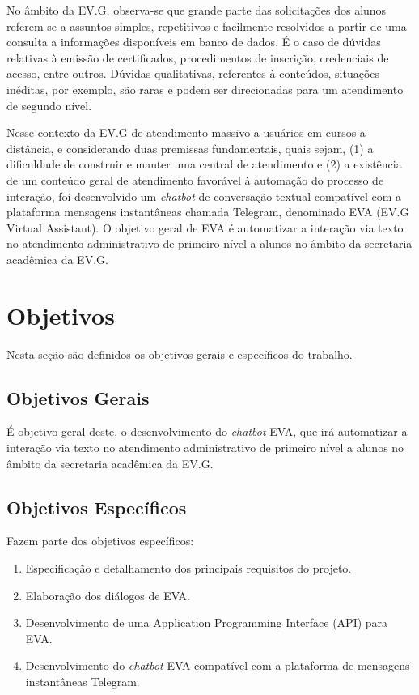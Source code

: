 No âmbito da EV.G, observa-se que grande parte das solicitações dos alunos referem-se a assuntos simples, repetitivos e facilmente resolvidos a partir de uma consulta a informações disponíveis em banco de dados. É o caso de dúvidas relativas à emissão de certificados, procedimentos de inscrição, credenciais de acesso, entre outros. Dúvidas qualitativas, referentes à conteúdos, situações inéditas, por exemplo, são raras e podem ser direcionadas para um atendimento de segundo nível.   

Nesse contexto da EV.G de atendimento massivo a usuários em cursos a distância, e considerando duas premissas fundamentais, quais sejam, (1) a dificuldade de construir e manter uma central de atendimento e (2) a existência de um conteúdo geral de atendimento favorável à automação do processo de interação, foi desenvolvido um \textit{chatbot} de conversação textual compatível com a plataforma mensagens instantâneas chamada Telegram, denominado EVA (EV.G Virtual Assistant). O objetivo geral de EVA é automatizar a interação via texto no atendimento administrativo de primeiro nível a alunos no âmbito da secretaria acadêmica da EV.G.

\section{Objetivos}\label{cap:01:sec:01:objetivos}

Nesta seção são definidos os objetivos gerais e específicos do trabalho.


\subsection{Objetivos Gerais}\label{cap:01:sec:01:sub:01:objetivo-geral}

É objetivo geral deste, o desenvolvimento do \textit{chatbot} EVA, que irá automatizar a interação via texto no atendimento administrativo de primeiro nível a alunos no âmbito da secretaria acadêmica da EV.G.


\subsection{Objetivos Específicos}\label{cap:01:sec:01:sub:02:ojetivos-especificos}

Fazem parte dos objetivos específicos:

\begin{enumerate}[label=\alph*)]
\tightlist
\item
Especificação e detalhamento dos principais requisitos do projeto.
\item
Elaboração dos diálogos de EVA.
\item 
Desenvolvimento de uma Application Programming Interface (API) para EVA.
\item
Desenvolvimento do \textit{chatbot} EVA compatível com a plataforma de mensagens instantâneas Telegram.
\end{enumerate}


